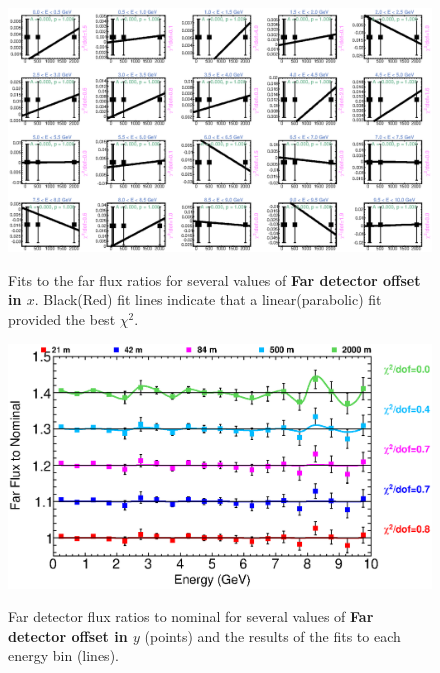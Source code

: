 \begin{figure}[ht]
  \begin{center}
    {\includegraphics[width=5.0in]{figures/LBNEFDX_far_fits.eps}}
  \end{center}
\caption{ Fits to the far flux ratios for several values of {\bf Far detector offset in $x$}. Black(Red) fit lines indicate that a linear(parabolic) fit provided the best $\chi^2$. }
\end{figure}

\begin{figure}[ht]
  \begin{center}
    {\includegraphics[width=6.0in]{figures/LBNEFDY_far_summary.eps}}
  \end{center}
\caption{ Far detector flux ratios to nominal for several values of {\bf Far detector offset in $y$} (points) and the results of the fits to each energy bin (lines).}
\end{figure}

